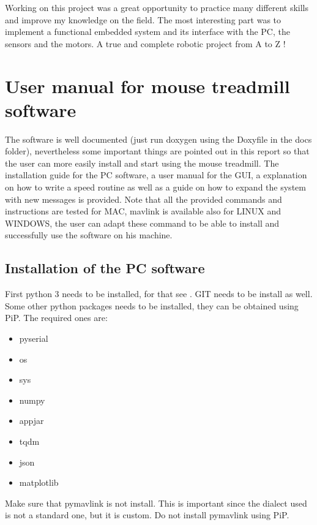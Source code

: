 \documentclass[12pt,a4paper, twoside]{article}
\begin{document}
Working on this project was a great opportunity to practice many different skills and improve my knowledge on the field. The most interesting part was to implement a functional embedded system and its interface with the PC, the sensors and the motors. A true and complete robotic project from A to Z !



\newpage
\section[User manual]{User manual for mouse treadmill software}\label{sec:user_manual}
The software is well documented (just run doxygen using the Doxyfile in the docs folder), nevertheless some important things are pointed out in this report so that the user can more easily install and start using the mouse treadmill. The installation guide for the PC software, a user manual for the GUI, a explanation on how to write a speed routine as well as a guide on how to expand the system with new messages is provided. Note that all the provided commands and instructions are tested for MAC, mavlink is available also for LINUX and WINDOWS, the user can adapt these command to be able to install and successfully use the software on his machine. 
\subsection{Installation of the PC software}\label{sec:install}
First python 3 needs to be installed, for that see \cite{py}. GIT needs to be install as well. Some other python packages needs to be installed, they can be obtained using PiP. The required ones are:\\
\begin{multicols}{3}[]
	\begin{itemize}
		\item pyserial
		\item os
		\item sys
		\item numpy
		\item appjar
		\item tqdm
		\item json
		\item matplotlib
	\end{itemize}
\end{multicols}

Make sure that pymavlink is not install. This is important since the dialect used is not a standard one, but it is custom. Do not install pymavlink using PiP.\\
\end{document}
